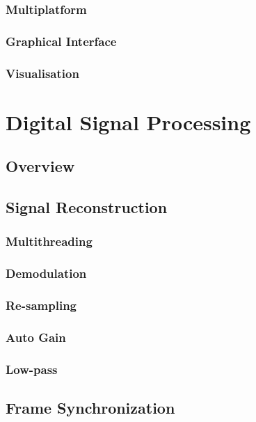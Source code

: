 \documentclass[a4paper,12pt,twoside,openright]{report}
\begin{document}
{{{{{\subsubsection{Multiplatform}

\subsubsection{Graphical Interface}

\subsubsection{Visualisation}

\section{Digital Signal Processing}

\subsection{Overview}

\subsection{Signal Reconstruction}

\subsubsection{Multithreading}

\subsubsection{Demodulation}

\subsubsection{Re-sampling}

\subsubsection{Auto Gain}

\subsubsection{Low-pass}

\subsection{Frame Synchronization}

}}}}}
\end{document}
